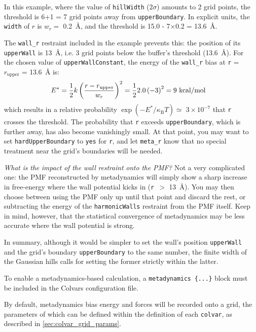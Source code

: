 In this example, where the value of \texttt{hillWidth} ($2\sigma$) amounts to 2 grid points, the threshold is 6+1 = 7 grid points away from \texttt{upperBoundary}.
In explicit units, the \texttt{width} of $r$ is $w_r =$ 0.2~\AA, and the threshold is 15.0 - 7$\times$0.2 = 13.6~\AA.

The \texttt{wall\_r} restraint included in the example prevents this: the position of its \texttt{upperWall} is 13~\AA{}, i.e.{} 3 grid points below the buffer's threshold (13.6~\AA).
For the chosen value of \texttt{upperWallConstant}, the energy of the \texttt{wall\_r} bias at \texttt{r} = $r_{\mathrm{upper}}$ = 13.6~\AA{} is:
\begin{equation*}
  E^* = \frac{1}{2} \- k \left(\frac{r - r_{\mathrm{upper}}}{w_r}\right)^2 = \frac{1}{2} \- 2.0 \left(-3\right)^2 = 9~\mathrm{kcal/mol}
\end{equation*}
which results in a relative probability $\exp(-E^*/\kappa_{\mathrm{B}}T) \simeq$ $3\times{}10^{-7}$ that \texttt{r} crosses the threshold.
The probability that \texttt{r} exceeds \texttt{upperBoundary}, which is further away, has also become vanishingly small.
At that point, you may want to set \texttt{hardUpperBoundary} to \texttt{yes} for \texttt{r}, and let \texttt{meta\_r} know that no special treatment near the grid's boundaries will be needed.

\emph{What is the impact of the wall restraint onto the PMF?} Not a very complicated one: the PMF reconstructed by metadynamics will simply show a sharp increase in free-energy where the wall potential kicks in (\texttt{r}~$>$ 13~\AA{}).
You may then choose between using the PMF only up until that point and discard the rest, or subtracting the energy of the \texttt{harmonicWalls} restraint from the PMF itself.
Keep in mind, however, that the statistical convergence of metadynamics may be less accurate where the wall potential is strong.

In summary, although it would be simpler to set the wall's position \texttt{upperWall} and the grid's boundary \texttt{upperBoundary} to the same number, the finite width of the Gaussian hills calls for setting the former strictly within the latter.



To enable a metadynamics-based calculation, a \texttt{metadynamics \{...\}} block must be included in the Colvars configuration file.

By default, metadynamics bias energy and forces will be recorded onto a grid, the parameters of which can be defined within the definition of each \texttt{colvar}, as described in \ref{sec:colvar_grid_params}.

